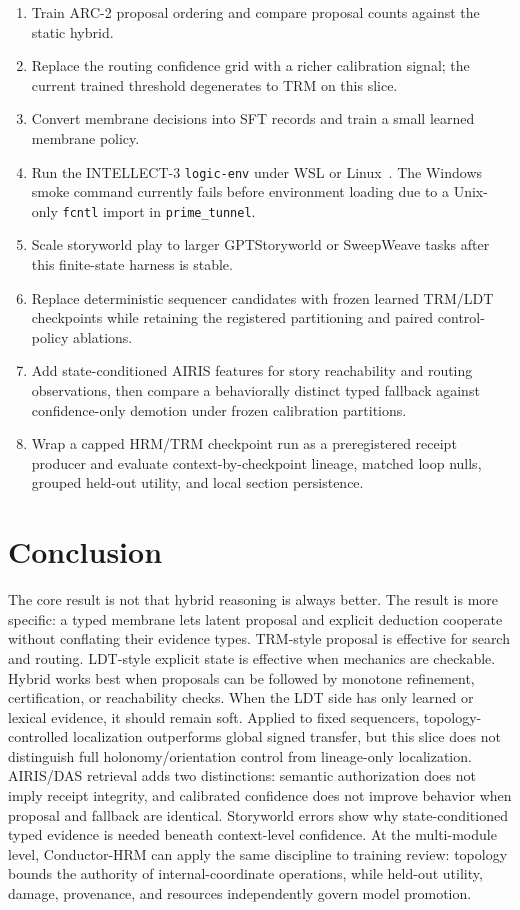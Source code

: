 \documentclass[11pt]{article}
\begin{document}
\begin{enumerate}
  \item Train ARC-2 proposal ordering and compare proposal counts against the static hybrid.
  \item Replace the routing confidence grid with a richer calibration signal; the current trained threshold degenerates to TRM on this slice.
  \item Convert membrane decisions into SFT records and train a small learned membrane policy.
  \item Run the INTELLECT-3 \texttt{logic-env} under WSL or Linux~\cite{primeintellect2026logic}. The Windows smoke command currently fails before environment loading due to a Unix-only \texttt{fcntl} import in \texttt{prime\_tunnel}.
  \item Scale storyworld play to larger GPTStoryworld or SweepWeave tasks after this finite-state harness is stable.
  \item Replace deterministic sequencer candidates with frozen learned TRM/LDT checkpoints while retaining the
  registered partitioning and paired control-policy ablations.
  \item Add state-conditioned AIRIS features for story reachability and routing observations, then compare a
  behaviorally distinct typed fallback against confidence-only demotion under frozen calibration partitions.
  \item Wrap a capped HRM/TRM checkpoint run as a preregistered receipt producer and evaluate context-by-checkpoint
  lineage, matched loop nulls, grouped held-out utility, and local section persistence.
\end{enumerate}

\section{Conclusion}

The core result is not that hybrid reasoning is always better. The result is more specific: a typed membrane lets latent proposal and explicit deduction cooperate without conflating their evidence types. TRM-style proposal is effective for search and routing. LDT-style explicit state is effective when mechanics are checkable. Hybrid works best when proposals can be followed by monotone refinement, certification, or reachability checks. When the LDT side has only learned or lexical evidence, it should remain soft. Applied to fixed sequencers, topology-controlled localization outperforms global signed transfer, but this slice does not distinguish full holonomy/orientation control from lineage-only localization. AIRIS/DAS retrieval adds two distinctions: semantic authorization does not imply receipt integrity, and calibrated confidence does not improve behavior when proposal and fallback are identical. Storyworld errors show why state-conditioned typed evidence is needed beneath context-level confidence. At the multi-module level, Conductor-HRM can apply the same discipline to training review: topology bounds the authority of internal-coordinate operations, while held-out utility, damage, provenance, and resources independently govern model promotion.



\end{document}

